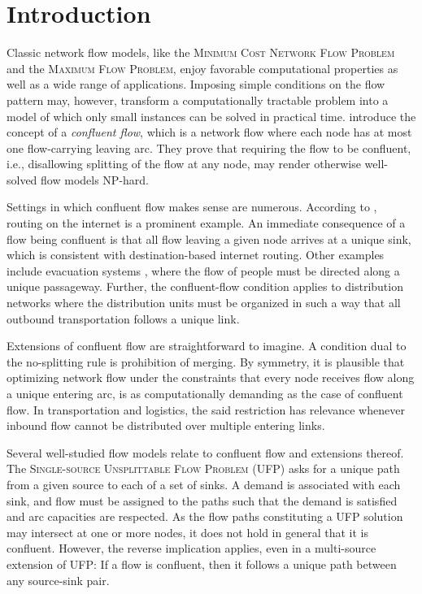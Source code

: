 \documentclass[pdflatex,sn-mathphys-num]{sn-jnl}%
\theoremstyle{thmstyleone}%
\begin{document}
\section{Introduction} \label{intro}

Classic network flow models, like the \textsc{Minimum Cost Network Flow Problem} and the \textsc{Maximum Flow Problem},
enjoy favorable computational properties as well as a wide range of applications.
Imposing simple conditions on the flow pattern may, however,
transform a computationally tractable problem into a model of which only small instances can be solved in practical time.
\citet{chen2006merge} introduce the concept of a \emph{confluent flow}, which is a network flow where each node has at most one flow-carrying leaving arc.
They prove that requiring the flow to be confluent, i.e., disallowing splitting of the flow at any node, may render otherwise well-solved flow models NP-hard.

Settings in which confluent flow makes sense are numerous.
According to \citet{chen2006merge,chen2007confluent}, routing on the internet is a prominent example.
An immediate consequence of a flow being confluent is that all flow leaving a given node arrives at a unique sink,
which is consistent with destination-based internet routing.
Other examples include evacuation systems \citep{mamada2005evacuation}, where the flow of people must be directed along a unique passageway.
Further, the confluent-flow condition applies to distribution networks where the distribution units must be organized in such a way that
all outbound transportation follows a unique link.

Extensions of confluent flow are straightforward to imagine.
A condition dual to the no-splitting rule is prohibition of merging.
By symmetry, it is plausible that optimizing network flow under the constraints that every node receives flow along a unique entering arc,
is as computationally demanding as the case of confluent flow.
In transportation and logistics, the said restriction has relevance whenever inbound flow cannot be distributed over multiple entering links.

Several well-studied flow models relate to confluent flow and extensions thereof.
The \textsc{Single-source Unsplittable Flow Problem} (UFP) \citep{kleinberg1996unsplittable,dinitz99} asks for a unique path from a given source to each of a set of sinks.
A demand is associated with each sink, and flow must be assigned to the paths such that the demand is satisfied and arc capacities are respected.
As the flow paths constituting a UFP solution may intersect at one or more nodes, it does not hold in general that it is confluent.
However, the reverse implication applies, even in a multi-source extension of UFP: If a flow is confluent, then it follows a unique path between any source-sink pair.
\end{document}
